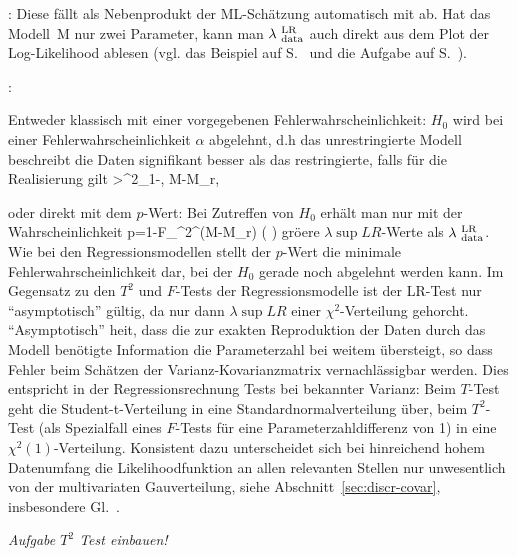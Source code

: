 \item {}: Diese
f\"allt als Nebenprodukt der ML-Sch\"atzung automatisch mit ab. Hat
das Modell~M nur zwei Parameter, 
kann man $\lambda^{{\mbox{ {\scriptsize \hspace{-0.0ex}LR}}}}_{{\mbox{ {\scriptsize \hspace{-0.0ex}data}}}}$ auch direkt aus dem Plot der Log-Likelihood
ablesen (vgl. das Beispiel auf S.~\pageref{bspLRGraph} und
die Aufgabe auf S.~\pageref{aufg:topDown}).

\item {}: 
\bi
\item Entweder klassisch mit einer vorgegebenen
Fehlerwahrscheinlichkeit: $H_0$ wird bei einer
Fehlerwahrscheinlichkeit $\alpha$ abgelehnt, d.h das unrestringierte
Modell beschreibt die Daten signifikant besser als das restringierte,
falls f\"ur die Realisierung gilt
\be
\label{LRergebnis}
\lambda{}>\chi^2_{1-\alpha, M-M_r},
\ee

\item oder direkt mit dem $p$-Wert: Bei Zutreffen von $H_0$ erh\"alt
man nur mit der Wahrscheinlichkeit
\be
\label{LRpWert}
p=1-F_{\chi^2}^{(M-M_r)} \big(\lambda{} \big)
\ee
gr\"o\3ere $\lambda\sup{LR}$-Werte als $\lambda^{{\mbox{ {\scriptsize \hspace{-0.0ex}LR}}}}_{{\mbox{ {\scriptsize \hspace{-0.0ex}data}}}}$. Wie bei den
Regressionsmodellen stellt der $p$-Wert die minimale
Fehlerwahrscheinlichkeit dar, bei der $H_0$ gerade noch abgelehnt
werden kann.
\ei
\eenum
Im Gegensatz zu den $T^2$ und $F$-Tests  der Regressionsmodelle ist
der LR-Test nur ``asymptotisch'' g\"ultig, da nur dann $\lambda\sup{LR}$ einer
$\chi^2$-Verteilung gehorcht.
``Asymptotisch'' hei\3t, dass die zur exakten
Reproduktion der Daten durch das Modell ben\"otigte Information die
Parameterzahl bei weitem \"ubersteigt, so dass Fehler beim Sch\"atzen
der Varianz-Kovarianzmatrix vernachl\"assigbar werden. Dies entspricht
in der Regressionsrechnung Tests bei bekannter Varianz: Beim $T$-Test geht
die Student-t-Verteilung in eine
Standardnormalverteilung \"uber, beim $T^2$-Test (als Spezialfall
eines $F$-Tests f\"ur eine Parameterzahldifferenz von 1) in eine
$\chi^2(1)$-Verteilung. Konsistent dazu 
 unterscheidet sich bei hinreichend hohem Datenumfang
die Likelihoodfunktion an
allen relevanten Stellen nur unwesentlich von der 
 multivariaten Gau\3verteilung, siehe Abschnitt~\ref{sec:discr-covar},
 insbesondere Gl.~. 

\emph{Aufgabe $T^2$ Test einbauen!}
 

